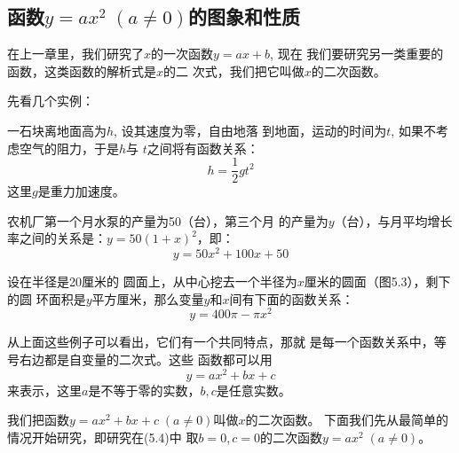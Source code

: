 \subsection{函数$y=ax^2\; (a\ne 0)$的图象和性质}
在上一章里，我们研究了$x$的一次函数$y=ax+b$, 现在
我们要研究另一类重要的函数，这类函数的解析式是$x$的二
次式，我们把它叫做$x$的二次函数。

先看几个实例：

\begin{example}
    一石块离地面高为$h$, 设其速度为零，自由地落
到地面，运动的时间为$t$, 如果不考虑空气的阻力，于是$h$与
$t$之间将有函数关系：
\begin{equation}
 h=\frac{1}{2}gt^2   
\end{equation}
这里$g$是重力加速度。
\end{example}

\begin{example}
    农机厂第一个月水泵的产量为50（台），第三个月
的产量为$y$（台），与月平均增长
率之间的关系是：$y=50(1+x)^2$，即：
\begin{equation}
  y=50x^2+100x+50  
\end{equation}
\end{example}

\begin{example}
    设在半径是20厘米的
圆面上，从中心挖去一个半径为$x$厘米的圆面（图5.3），剩下的圆
环面积是$y$平方厘米，那么变量$y$和$x$间有下面的函数关系：
\begin{equation}
    y=400\pi-\pi x^2
\end{equation}
\end{example}

\begin{figure}[htp]
    \centering
{}    
    \caption{}
\end{figure}

从上面这些例子可以看出，它们有一个共同特点，那就
是每一个函数关系中，等号右边都是自变量的二次式。这些
函数都可以用
\begin{equation}
    y=ax^2+bx+c
\end{equation}
来表示，这里$a$是不等于零的实数，$b,c$是任意实数。

我们把函数$y=ax^2+bx+c\; (a\ne 0)$叫做$x$的二次函数。
下面我们先从最简单的情况开始研究，即研究在(5.4)中
取$b=0,c=0$的二次函数$y=ax^2\; (a\ne 0)$。

